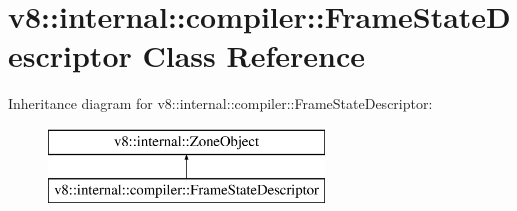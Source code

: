 \hypertarget{classv8_1_1internal_1_1compiler_1_1_frame_state_descriptor}{}\section{v8\+:\+:internal\+:\+:compiler\+:\+:Frame\+State\+Descriptor Class Reference}
\label{classv8_1_1internal_1_1compiler_1_1_frame_state_descriptor}
Inheritance diagram for v8\+:\+:internal\+:\+:compiler\+:\+:Frame\+State\+Descriptor\+:\begin{figure}[H]
\begin{center}
\leavevmode
\includegraphics[height=2.000000cm]{classv8_1_1internal_1_1compiler_1_1_frame_state_descriptor}
\end{center}
\end{figure}
